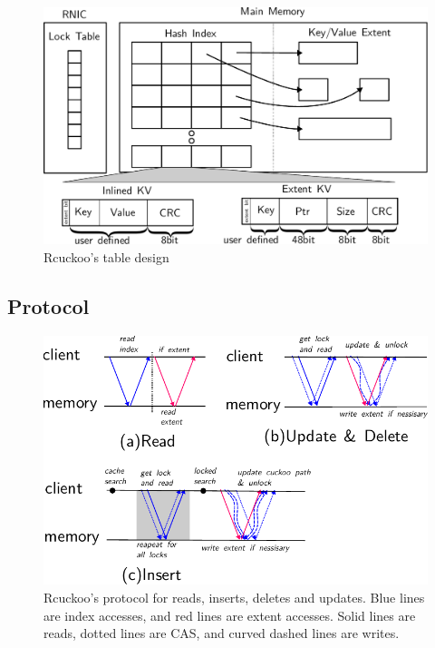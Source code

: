 \begin{figure}[t]
    \includegraphics[width=0.99\linewidth]{fig/table-diagram.pdf}
    \caption{Rcuckoo's table design}
    \label{fig:table-diagram}
\end{figure}


\subsection{Protocol}

\begin{figure}[t]
\includegraphics[width=0.99\linewidth]{fig/message_diagram.pdf}

\caption{Rcuckoo's protocol for reads, inserts, deletes and
updates. Blue lines are index accesses, and red lines are
extent accesses. Solid lines are reads, dotted lines are
CAS, and curved dashed lines are writes.}

\label{fig:message_diagram}
\end{figure}

